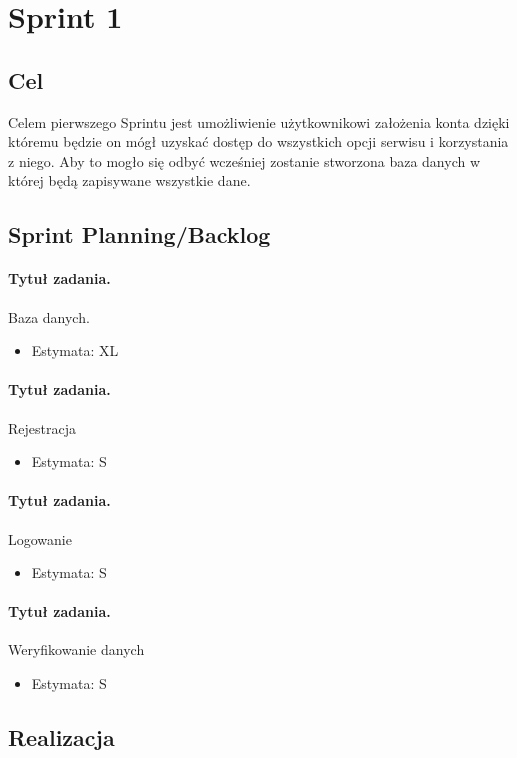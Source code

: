\documentclass[a4paper]{article}
\begin{document}
	\section{Sprint 1}
	\subsection{Cel} Celem pierwszego Sprintu jest umożliwienie użytkownikowi założenia konta dzięki któremu będzie on mógł uzyskać dostęp do wszystkich opcji serwisu i korzystania z niego. Aby to mogło się odbyć wcześniej zostanie stworzona baza danych w której będą zapisywane wszystkie dane.
	\subsection{Sprint Planning/Backlog}
	
	\paragraph{Tytuł zadania.} Baza danych.
	\begin{itemize}
		\item Estymata: XL
	\end{itemize}
	
	\paragraph{Tytuł zadania.} Rejestracja
	\begin{itemize}
		\item Estymata: S
	\end{itemize}
	
	\paragraph{Tytuł zadania.} Logowanie
	\begin{itemize}
		\item Estymata: S
	\end{itemize}
	
	\paragraph{Tytuł zadania.} Weryfikowanie danych
	\begin{itemize}
		\item Estymata: S
	\end{itemize}
	
	\subsection{Realizacja}
	
\end{document}
